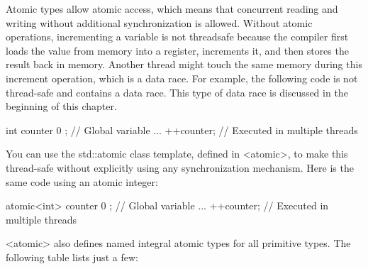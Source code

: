 
Atomic types allow atomic access, which means that concurrent reading and writing without additional synchronization is allowed. Without atomic operations, incrementing a variable is not threadsafe because the compiler first loads the value from memory into a register, increments it, and then stores the result back in memory. Another thread might touch the same memory during this increment operation, which is a data race. For example, the following code is not thread-safe and contains a data race. This type of data race is discussed in the beginning of this chapter.

\begin{cpp}
int counter { 0 }; // Global variable
...
++counter; // Executed in multiple threads
\end{cpp}

You can use the std::atomic class template, defined in <atomic>, to make this thread-safe without explicitly using any synchronization mechanism. Here is the same code using an atomic integer:

\begin{cpp}
atomic<int> counter { 0 } ; // Global variable
...
++counter; // Executed in multiple threads
\end{cpp}

<atomic> also defines named integral atomic types for all primitive types. The following table lists just a few:


